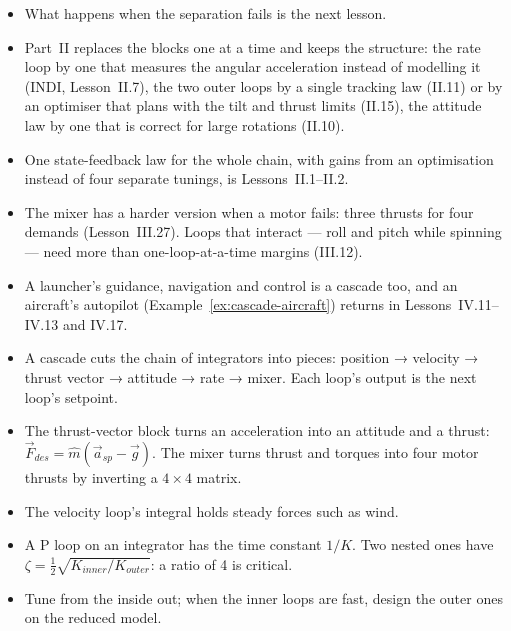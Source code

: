 \begin{lookahead}
\begin{itemize}[leftmargin=1.2em]
  \item What happens when the separation fails is the next lesson.
  \item Part~II replaces the blocks one at a time and keeps the structure: the rate loop by one that measures the angular acceleration instead of modelling it (INDI, Lesson~II.7), the two outer loops by a single tracking law (II.11) or by an optimiser that plans with the tilt and thrust limits (II.15), the attitude law by one that is correct for large rotations (II.10).
  \item One state-feedback law for the whole chain, with gains from an optimisation instead of four separate tunings, is Lessons~II.1–II.2.
  \item The mixer has a harder version when a motor fails: three thrusts for four demands (Lesson~III.27). Loops that interact — roll and pitch while spinning — need more than one-loop-at-a-time margins (III.12).
  \item A launcher's guidance, navigation and control is a cascade too, and an aircraft's autopilot (Example~\ref{ex:cascade-aircraft}) returns in Lessons~IV.11–IV.13 and IV.17.
\end{itemize}
\end{lookahead}

\begin{remember}
\begin{itemize}
  \item A cascade cuts the chain of integrators into pieces: position → velocity → thrust vector → attitude → rate → mixer. Each loop's output is the next loop's setpoint.
  \item The thrust-vector block turns an acceleration into an attitude and a thrust: $\vec F_{des} = \hat m(\vec a_{sp} - \vec g)$. The mixer turns thrust and torques into four motor thrusts by inverting a $4 \times 4$ matrix.
  \item The velocity loop's integral holds steady forces such as wind.
  \item A P loop on an integrator has the time constant $1/K$. Two nested ones have $\zeta = \tfrac12\sqrt{K_{inner}/K_{outer}}$: a ratio of 4 is critical.
  \item Tune from the inside out; when the inner loops are fast, design the outer ones on the reduced model.
\end{itemize}
\end{remember}

